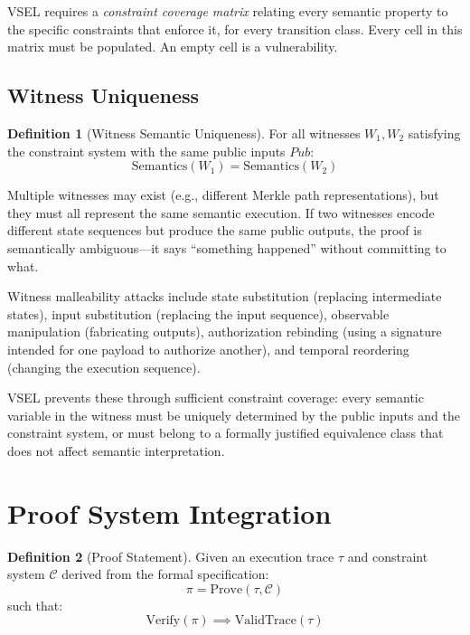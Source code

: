 \documentclass[11pt,a4paper]{article}
\theoremstyle{definition}
\newtheorem{definition}{Definition}[section]
\newcommand{\Verify}{\mathrm{Verify}}
\newcommand{\Prove}{\mathrm{Prove}}
\newcommand{\ValidTrace}{\mathrm{ValidTrace}}
\begin{document}
VSEL requires a \emph{constraint coverage matrix} relating every semantic property to the specific constraints that enforce it, for every transition class. Every cell in this matrix must be populated. An empty cell is a vulnerability.

\subsection{Witness Uniqueness}
\label{subsec:witness-uniqueness}

\begin{definition}[Witness Semantic Uniqueness]
\label{def:witness-uniqueness}
For all witnesses $W_1, W_2$ satisfying the constraint system with the same public inputs $\mathit{Pub}$:
\begin{equation}
\mathrm{Semantics}(W_1) = \mathrm{Semantics}(W_2)
\end{equation}
\end{definition}

Multiple witnesses may exist (e.g., different Merkle path representations), but they must all represent the same semantic execution. If two witnesses encode different state sequences but produce the same public outputs, the proof is semantically ambiguous---it says ``something happened'' without committing to what.

Witness malleability attacks include state substitution (replacing intermediate states), input substitution (replacing the input sequence), observable manipulation (fabricating outputs), authorization rebinding (using a signature intended for one payload to authorize another), and temporal reordering (changing the execution sequence).

VSEL prevents these through sufficient constraint coverage: every semantic variable in the witness must be uniquely determined by the public inputs and the constraint system, or must belong to a formally justified equivalence class that does not affect semantic interpretation.

\section{Proof System Integration}
\label{sec:proof-system}

\begin{definition}[Proof Statement]
\label{def:proof-statement}
Given an execution trace $\tau$ and constraint system $\mathcal{C}$ derived from the formal specification:
\begin{equation}
\pi = \Prove(\tau, \mathcal{C})
\end{equation}
such that:
\begin{equation}
\Verify(\pi) \implies \ValidTrace(\tau)
\end{equation}
\end{definition}
\end{document}
